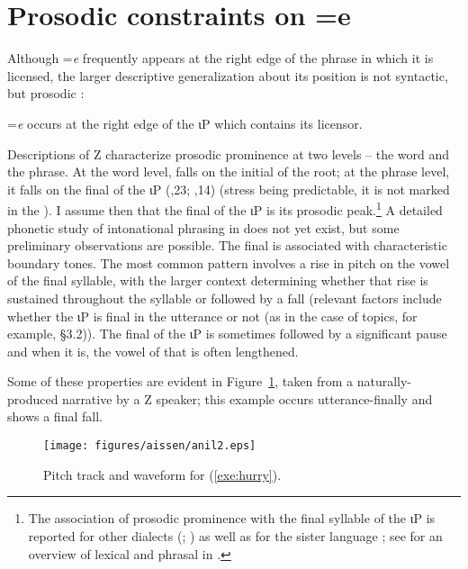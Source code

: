 \documentclass[output=paper,
modfonts
]{LSP/langsci}
\begin{document}
 \section{Prosodic constraints on ={e}}
Although =\emph{e}  frequently appears at the right edge of the phrase in which it is licensed,
 the larger descriptive generalization about its position is not syntactic, but prosodic \citep{aissen1992, skopeteas2010}:
 \begin{exe}
\ex
=\emph{e} occurs at the right edge of the ιP which contains its licensor.
\label{exe:gen6}
\end{exe}
Descriptions of Z  characterize prosodic prominence at two levels  --  the word and the phrase. 
At the word level,  falls on the initial  of the root; at the phrase level, it
 falls on the final  of the ιP (\citealt{laughlin1975},23; \citealt{haviland1981},14) (stress being predictable, it is not marked in the ).
I assume then that the final  of the ιP is its prosodic peak.\footnote
{The association of prosodic prominence with the final \isi{}syllable of the ιP is reported for other  dialects (\citealt[4]{cowan1969}; \citealt[11]{delgaty78})
 as well as for the sister language  \citep{shklovsky2011, polian2013}; see \citet[\S6.1]{bennett2016} for an overview of lexical and phrasal
 in .}
A detailed phonetic study of intonational phrasing in  does not yet exist, but some preliminary observations are possible. 
The final  is associated with characteristic boundary tones. The most common pattern involves a rise in pitch on the vowel of the final syllable,
with the larger context determining whether that rise is sustained throughout the syllable or followed by a fall (relevant factors include whether
the ιP is final in the utterance or not (as in the case of topics, for example, \S3.2)). 
The final  of the ιP is sometimes followed by a significant pause and when it is, the vowel of that  is often lengthened.

Some of these properties are evident in Figure~\ref{fig:hurry}, taken from a naturally-produced narrative by a Z  speaker; this example occurs utterance-finally
and shows a final fall.

\begin{figure}
 	\texttt{[image: figures/aissen/anil2.eps]}
	\caption{Pitch track and waveform for (\ref{exe:hurry}).}
	\label{fig:hurry}
\end{figure}
\end{document}
